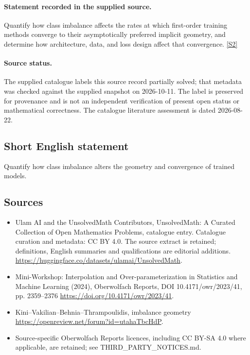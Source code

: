 \documentclass[11pt]{article}
\begin{document}
\paragraph{Statement recorded in the supplied source.}
Quantify how class imbalance affects the rates at which first-order training methods converge to their asymptotically preferred implicit geometry, and determine how architecture, data, and loss design affect that convergence. \href{https://doi.org/10.4171/owr/2023/41}{[S2]}
\paragraph{Source status.}
The supplied catalogue labels this source record partially solved; that metadata was checked against the supplied snapshot on 2026-10-11. The label is preserved for provenance and is not an independent verification of present open status or mathematical correctness. The catalogue literature assessment is dated 2026-08-22.
\subsection{Short English statement}
Quantify how class imbalance alters the geometry and convergence of trained models.
\subsection{Sources}
\begin{itemize}
\item[S1] Ulam AI and the UnsolvedMath Contributors, UnsolvedMath: A Curated Collection of Open Mathematics Problems, catalogue entry. Catalogue curation and metadata: CC BY 4.0. The source extract is retained; definitions, English summaries and qualifications are editorial additions.
\url{https://huggingface.co/datasets/ulamai/UnsolvedMath}.
\item[S2] Mini-Workshop: Interpolation and Over-parameterization in Statistics and Machine Learning​ (2024), Oberwolfach Reports, DOI 10.4171/owr/2023/41, pp. 2359--2376
\url{https://doi.org/10.4171/owr/2023/41}.
\item[S3] Kini--Vakilian--Behnia--Thrampoulidis, imbalance geometry
\url{https://openreview.net/forum?id=utahaTbcHdP}.
\item Source-specific Oberwolfach Reports licences, including CC BY-SA 4.0 where applicable, are retained; see THIRD\_PARTY\_NOTICES.md.
\end{itemize}
\end{document}
